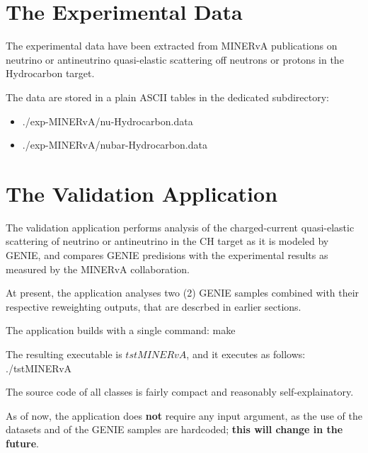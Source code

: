 \section{The Experimental Data}

The experimental data have been extracted from MINERvA publications\cite{minerva1} on neutrino or antineutrino 
quasi-elastic scattering off neutrons or protons in the Hydrocarbon target. 

The data are stored in a plain ASCII tables in the dedicated subdirectory:
\begin{itemize}
\item{./exp-MINERvA/nu-Hydrocarbon.data}
\item{./exp-MINERvA/nubar-Hydrocarbon.data}
\end{itemize}

\section{The Validation Application}

The validation application performs analysis of the charged-current quasi-elastic scattering of neutrino 
or antineutrino in the CH target as it is modeled by GENIE, and compares GENIE predisions with the
experimental results as measured by the MINERvA collaboration.

At present, the application analyses two (2) GENIE samples combined with their respective reweighting
outputs, that are descrbed in earlier sections.

The application builds with a single command:
make

The resulting executable is $tstMINERvA$, and it executes as follows:
./tstMINERvA

The source code of all classes is fairly compact and reasonably self-explainatory.

As of now, the application does {\bf not } require any input argument, as the use of the datasets and
of the GENIE samples are hardcoded; {\bf this will change in the future}.

